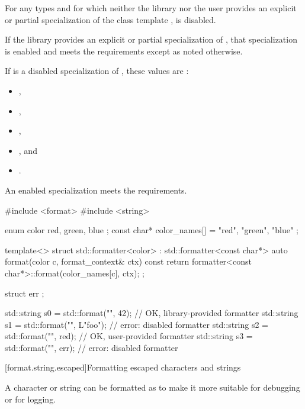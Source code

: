 \pnum
For any types  and  for which
neither the library nor the user provides
an explicit or partial specialization of
the class template ,
 is disabled.

\pnum
If the library provides an explicit or partial specialization of
, that specialization is enabled
and meets the  requirements
except as noted otherwise.

\pnum
If  is a disabled specialization of , these
values are :
\begin{itemize}
\item {},
\item {},
\item {},
\item {}, and
\item {}.
\end{itemize}

\pnum
An enabled specialization  meets the
 requirements.
\begin{example}
\begin{codeblock}
#include <format>
#include <string>

enum color { red, green, blue };
const char* color_names[] = { "red", "green", "blue" };

template<> struct std::formatter<color> : std::formatter<const char*> {
  auto format(color c, format_context& ctx) const {
    return formatter<const char*>::format(color_names[c], ctx);
  }
};

struct err {};

std::string s0 = std::format("{}", 42);         // OK, library-provided formatter
std::string s1 = std::format("{}", L"foo");     // error: disabled formatter
std::string s2 = std::format("{}", red);        // OK, user-provided formatter
std::string s3 = std::format("{}", err{});      // error: disabled formatter
\end{codeblock}
\end{example}

[format.string.escaped]{Formatting escaped characters and strings}

\pnum
{}%
%
A character or string can be formatted as 
to make it more suitable for debugging or for logging.

